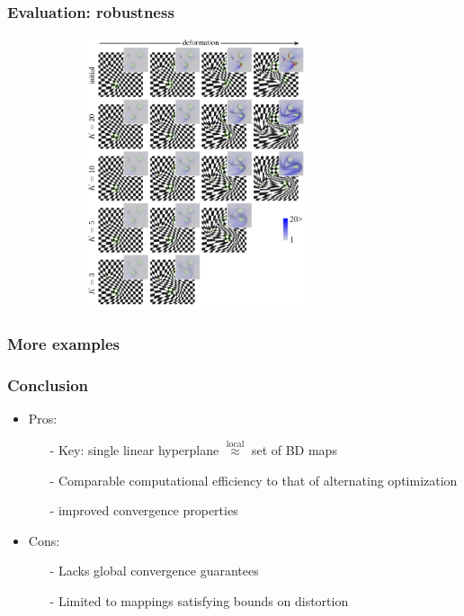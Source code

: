 \documentclass[serif,mathserif]{beamer}
\begin{document}
\begin{frame}
 \frametitle{Evaluation: robustness}
 \begin{figure}[t]
  \centering
  \includegraphics[width=9cm, height=8cm]{img/robustness.png}
 \end{figure}
\end{frame}

\begin{frame}
 \frametitle{More examples}
\end{frame}

\begin{frame}
 \frametitle{Conclusion}
 \begin{itemize}
  \item Pros:
    \begin{itemize}
      \item[-] Key: single linear hyperplane $\overset{\text{local}}{\approx}$ set of BD maps
      \item[-] Comparable computational efficiency to that of alternating optimization
      \item[-] improved convergence properties 
    \end{itemize}
  \item Cons:
    \begin{itemize}
      \item[-] Lacks global convergence guarantees
      \item[-] Limited to mappings satisfying bounds on distortion
  \end{itemize}
 \end{itemize}
\end{frame}

\begin{frame} 
\end{frame}
\end{document}
